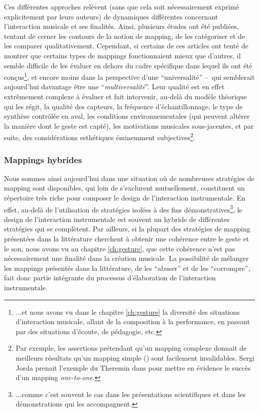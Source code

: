 \noindent Ces différentes approches relèvent (sans que cela soit nécessairement exprimé explicitement par leurs auteurs) de dynamiques différentes concernant l'interaction musicale et ses finalités. Ainsi, plusieurs études ont été publiées, tentant de cerner les contours de la notion de mapping, de les catégoriser et de les comparer qualitativement. Cependant, si certains de ces articles ont tenté de montrer que certains types de mappings fonctionnaient mieux que d'autres, il semble difficile de les évaluer en dehors du cadre spécifique dans lequel ils ont été conçus\footnote{...et nous avons vu dans le chapitre \ref{ch:gesture} la diversité des situations d'interaction musicale, allant de la composition à la performance, en passant par des situations d'écoute, de pédagogie, etc.}, et encore moins dans la perspective d'une ``universalité'' --~qui semblerait aujourd'hui davantage être une ``\textit{multiversalité}''. Leur qualité est en effet extrêmement complexe à évaluer et fait intervenir, au-delà du modèle théorique qui les régit, la qualité des capteurs, la fréquence d'échantillonnage, le type de synthèse contrôlée en aval, les conditions environnementales (qui peuvent altérer la manière dont le geste est capté), les motivations musicales sous-jacentes, et par suite, des considérations esthétiques éminemment subjectives\footnote{Par exemple, les assertions prétendant qu'un mapping complexe donnait de meilleurs résultats qu'un mapping simple (\cite{rovan_instrumental_1997, hunt_mapping_2000}) sont facilement invalidables. Sergi Jorda prenait l'exemple du Theremin dans \cite{jorda_digital_2005} pour mettre en évidence le succès d'un mapping \textit{one-to-one}.}.

\subsubsection{Mappings hybrides} 

\noindent Nous sommes ainsi aujourd'hui dans une situation où de nombreuses stratégies de mapping sont disponibles, qui loin de s'exclurent mutuellement, constituent un répertoire très riche pour composer le design de l'interaction instrumentale. En effet, au-delà de l'utilisation de stratégies isolées à des fins démonstratives\footnote{...comme c'est souvent le cas dans les présentations scientifiques et dans les démonstrations qui les accompagnent.}, le design de l'interaction instrumentale est souvent un hybride de différentes stratégies qui se complètent. Par ailleurs, si la plupart des stratégies de mapping présentées dans la littérature cherchent à obtenir une cohérence entre le geste et le son, nous avons vu au chapitre \ref{ch:gesture}, que cette cohérence n'est pas nécessairement une finalité dans la création musicale. La possibilité de mélanger les mappings présentés dans la littérature, de les ``abuser'' et de les ``corrompre'', fait donc partie intégrante du processus d'élaboration de l'interaction instrumentale.

